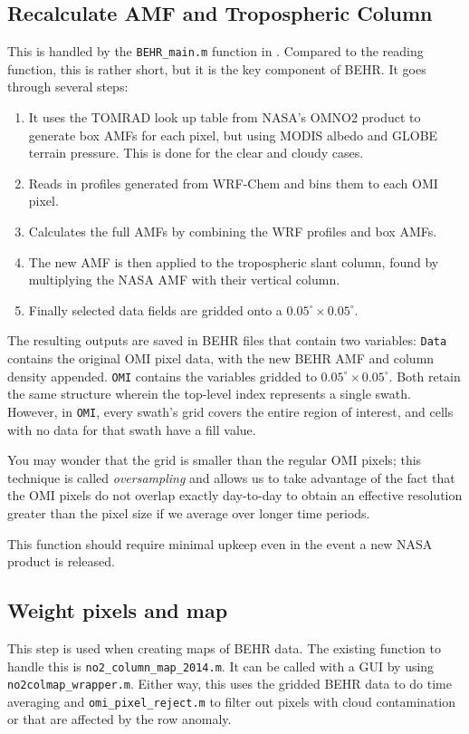 \documentclass[12pt]{article}
\begin{document}
	\subsection{Recalculate AMF and Tropospheric Column}
	
		This is handled by the \texttt{BEHR\_main.m} function in . Compared to the reading function, this is rather short, but it is the key component of BEHR. It goes through several steps:
		\begin{enumerate}
			\item It uses the TOMRAD look up table from NASA's OMNO2 product to generate box AMFs for each pixel, but using MODIS albedo and GLOBE terrain pressure.  This is done for the clear and cloudy cases.
			\item Reads in  profiles generated from WRF-Chem and bins them to each OMI pixel.
			\item Calculates the full AMFs by combining the WRF profiles and box AMFs.
			\item The new AMF is then applied to the tropospheric slant column, found by multiplying the NASA AMF with their vertical column.
			\item Finally selected data fields are gridded onto a $0.05^\circ \times 0.05^\circ$.  
		\end{enumerate}
		
		The resulting outputs are saved in BEHR files that contain two variables: \texttt{Data} contains the original OMI pixel data, with the new BEHR AMF and  column density appended. \texttt{OMI} contains the variables gridded to $0.05^\circ \times 0.05^\circ$. Both retain the same structure wherein the top-level index represents a single swath.  However, in \texttt{OMI}, every swath's grid covers the entire region of interest, and cells with no data for that swath have a fill value.
		
		You may wonder that the grid is smaller than the regular OMI pixels; this technique is called \emph{oversampling} and allows us to take advantage of the fact that the OMI pixels do not overlap exactly day-to-day to obtain an effective resolution greater than the pixel size if we average over longer time periods.
		
		This function should require minimal upkeep even in the event a new NASA product is released.
		
	\subsection{Weight pixels and map}
	This step is used when creating maps of BEHR  data. The existing function to handle this is \lstinline$no2_column_map_2014.m$. It can be called with a GUI by using \lstinline$no2colmap_wrapper.m$. Either way, this uses the gridded BEHR data to do time averaging and \lstinline$omi_pixel_reject.m$ to filter out pixels with cloud contamination or that are affected by the row anomaly.
	
\end{document}
